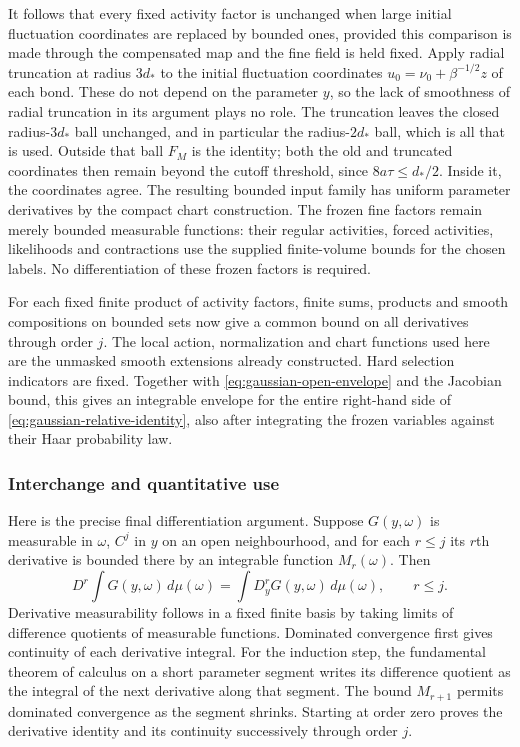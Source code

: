 It follows that every fixed activity factor is unchanged when
large initial fluctuation coordinates are replaced by bounded
ones, provided this comparison is made through the compensated
map and the fine field is held fixed. Apply radial truncation at
radius $3d_*$ to the initial fluctuation coordinates
$u_0=\nu_0+\beta^{-1/2}z$ of each bond. These do not depend on the
parameter $y$, so the lack of smoothness of radial truncation in its
argument plays no role. The truncation leaves the closed
radius-$3d_*$ ball unchanged, and in particular the radius-$2d_*$
ball, which is all that is used. Outside that ball $F_M$ is the
identity; both the old and truncated coordinates then remain beyond
the cutoff threshold, since $8a\tau\le d_*/2$. Inside it, the
coordinates agree. The resulting
bounded input family has uniform parameter derivatives by the
compact chart construction. The frozen fine factors remain merely
bounded measurable functions: their regular activities, forced
activities, likelihoods and contractions use the supplied
finite-volume bounds for the chosen labels. No differentiation
of these frozen factors is required.

For each fixed finite product of activity factors, finite sums,
products and smooth compositions on bounded sets now give a
common bound on all derivatives through order $j$. The local
action, normalization and chart functions used here are the
unmasked smooth extensions already constructed. Hard selection
indicators are fixed. Together with
\eqref{eq:gaussian-open-envelope} and the Jacobian bound, this
gives an integrable envelope for the entire right-hand side of
\eqref{eq:gaussian-relative-identity}, also after integrating the
frozen variables against their Haar probability law.

\subsubsection{Interchange and quantitative use}
Here is the precise final differentiation argument. Suppose
$G(y,\omega)$ is measurable in $\omega$, $C^j$ in $y$ on an open
neighbourhood, and for each $r\le j$ its $r$th derivative is
bounded there by an integrable function $M_r(\omega)$.
Then
\begin{equation}\label{eq:gaussian-differentiate-integral}
 D^r\int G(y,\omega)\,d\mu(\omega)
       =\int D_y^rG(y,\omega)\,d\mu(\omega),\qquad r\le j.
\end{equation}
Derivative measurability follows in a fixed finite basis by taking
limits of difference quotients of measurable functions. Dominated
convergence first gives continuity of each derivative integral.
For the induction step, the fundamental theorem of calculus on a
short parameter segment writes its difference quotient as the
integral of the next derivative along that segment. The bound
$M_{r+1}$ permits dominated convergence as the segment shrinks.
Starting at order zero proves the derivative identity and its
continuity successively through order $j$.

